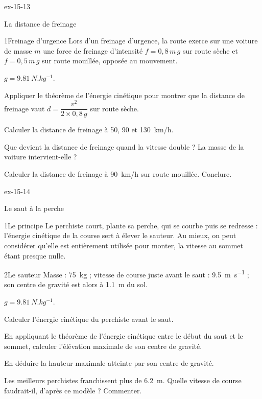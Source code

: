 \begin{blocLivre}{ex-15-13}
\begin{exercice}[3]{La distance de freinage}
\begin{docu}{1}{Freinage d'urgence}
Lors d'un freinage d'urgence, la route exerce sur une voiture de masse $m$ une force de freinage d'intensité $f=0{,}8\,m\,g$ sur route sèche et
$f=0{,}5\,m\,g$ sur route mouillée, opposée au mouvement.
\end{docu}
\begin{donnees}
$g=\qty{9,81}{N.kg^{-1}}$.
\end{donnees}
\begin{questions}
\item Appliquer le théorème de l'énergie cinétique pour montrer que la distance de freinage vaut $d=\dfrac{v^2}{2\times0{,}8\,g}$ sur route sèche.
\item Calculer la distance de freinage à 50, 90 et \qty{130}{km/h}.
\item Que devient la distance de freinage quand la vitesse double ? La masse de la voiture intervient-elle ?
\item \initiative Calculer la distance de freinage à \qty{90}{km/h} sur route mouillée. Conclure.
\end{questions}
\end{exercice}
\end{blocLivre}
\begin{blocLivre}{ex-15-14}
\begin{exercice}[3]{Le saut à la perche}
\begin{docu}{1}{Le principe}
Le perchiste court, plante sa perche, qui se courbe puis se redresse : l'énergie cinétique de la course sert à élever le sauteur.
Au mieux, on peut considérer qu'elle est entièrement utilisée pour monter, la vitesse au sommet étant presque nulle.
\end{docu}
\begin{docu}{2}{Le sauteur}
Masse : \qty{75}{kg} ; vitesse de course juste avant le saut : \qty{9,5}{m.s^{-1}} ; son centre de gravité est alors à \qty{1,1}{m} du sol.
\end{docu}
\begin{donnees}
$g=\qty{9,81}{N.kg^{-1}}$.
\end{donnees}
\begin{questions}
\item Calculer l'énergie cinétique du perchiste avant le saut.
\item En appliquant le théorème de l'énergie cinétique entre le début du saut et le sommet, calculer l'élévation maximale de son centre de gravité.
\item En déduire la hauteur maximale atteinte par son centre de gravité.
\item \initiative Les meilleurs perchistes franchissent plus de \qty{6,2}{m}. Quelle vitesse de course faudrait-il, d'après ce modèle ? Commenter.
\end{questions}
\end{exercice}
\end{blocLivre}
